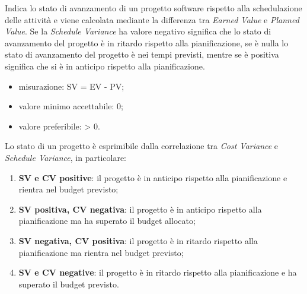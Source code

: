 		Indica lo stato di avanzamento di un progetto software rispetto alla schedulazione delle attività e viene calcolata mediante la differenza tra \textit{Earned Value} e \textit{Planned Value}.
		Se la \textit{Schedule Variance} ha valore negativo significa che lo stato di avanzamento del progetto è in ritardo rispetto alla pianificazione, se è nulla lo stato di avanzamento del progetto è nei tempi previsti, mentre se è positiva significa che si è in anticipo rispetto alla pianificazione.
		\begin{itemize}
			\item{misurazione: SV = EV - PV;}
			\item{valore minimo accettabile: 0;}
			\item{valore preferibile: > 0.}
		\end{itemize}
						
		Lo stato di un progetto è esprimibile dalla correlazione tra \textit{Cost Variance} e \textit{Schedule Variance}, in particolare:
		\begin{enumerate}
			\item{\textbf{SV e CV positive}: il progetto è in anticipo rispetto alla pianificazione e rientra nel budget previsto;}
			\item{\textbf{SV positiva, CV negativa}: il progetto è in anticipo rispetto alla pianificazione ma ha superato il budget allocato;}
			\item{\textbf{SV negativa, CV positiva}: il progetto è in ritardo rispetto alla pianificazione ma rientra nel budget previsto;}
			\item{\textbf{SV e CV negative}: il progetto è in ritardo rispetto alla pianificazione e ha superato il budget previsto.}
		\end{enumerate}